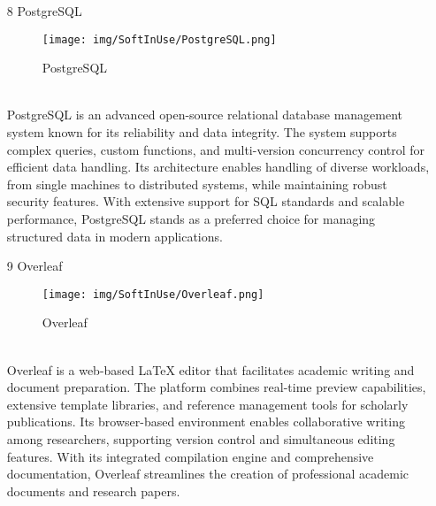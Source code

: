 \documentclass[conference]{IEEEtran}
\begin{document}
\begin{enumerate}
\begin{itemize}
\begin{itemize}
\begin{enumerate}
\item[8] PostgreSQL
\begin{figure}[h]
\centering
\texttt{[image: img/SoftInUse/PostgreSQL.png]}
\caption{PostgreSQL} 
\end{figure}\\
PostgreSQL is an advanced open-source relational database management system known for its reliability and data integrity. The system supports complex queries, custom functions, and multi-version concurrency control for efficient data handling. Its architecture enables handling of diverse workloads, from single machines to distributed systems, while maintaining robust security features. With extensive support for SQL standards and scalable performance, PostgreSQL stands as a preferred choice for managing structured data in modern applications.\\

\item[9] Overleaf
\begin{figure}[h]
\centering
\texttt{[image: img/SoftInUse/Overleaf.png]}
\caption{Overleaf} 
\end{figure}\\
Overleaf is a web-based LaTeX editor that facilitates academic writing and document preparation. The platform combines real-time preview capabilities, extensive template libraries, and reference management tools for scholarly publications. Its browser-based environment enables collaborative writing among researchers, supporting version control and simultaneous editing features. With its integrated compilation engine and comprehensive documentation, Overleaf streamlines the creation of professional academic documents and research papers.\\


\end{enumerate}
\end{itemize}
\end{itemize}
\end{enumerate}
\end{document}
